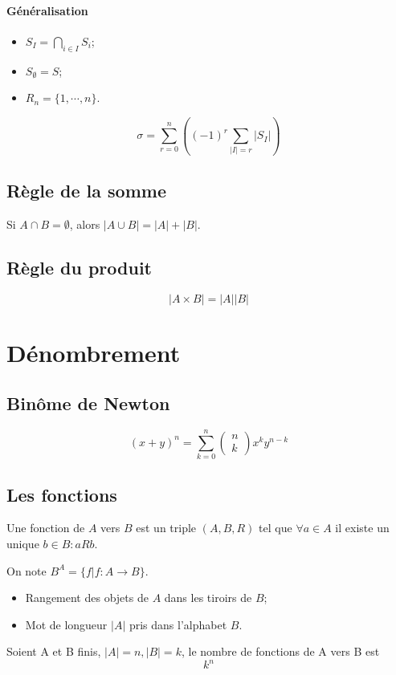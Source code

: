\paragraph{Généralisation}
\begin{itemize}
  \item $S_I = \bigcap_{i \in I} S_i$;
  \item $S_{\emptyset} = S$;
  \item $R_n = \{1, \cdots , n\}$.
\end{itemize}
\[ \sigma = \sum_{r = 0}^n\left ( (-1)^r \sum_{|I| = r}|S_I| \right ) \]

\subsection{Règle de la somme}
Si $A \cap B = \emptyset$, alors $|A \cup B| = |A| + |B|$.

\subsection{Règle du produit}
\[ |A \times B| = |A||B| \]

\section{Dénombrement}
\subsection{Binôme de Newton}
\[ (x + y)^n = \sum_{k = 0}^n \begin{pmatrix}n\\ k \end{pmatrix} x^ky^{n-k} \]

\subsection{Les fonctions}
Une fonction de $A$ vers $B$ est un triple $(A,B,R)$
tel que $\forall a \in A$ il existe un unique $b \in B : aRb$.

On note $B^{A} = \{f | f : A \rightarrow B\}$.

\begin{itemize}
  \item Rangement des objets de $A$ dans les tiroirs de $B$;
  \item Mot de longueur $|A|$ pris dans l'alphabet $B$.
\end{itemize}
Soient A et B finis, $|A| = n , |B| = k$, le nombre de fonctions de A vers B est
\[ k^n \]

